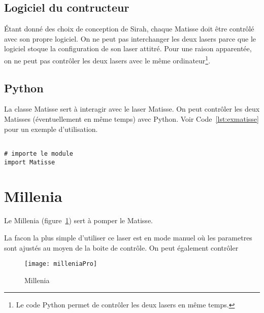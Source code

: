 \documentclass[11pt,francais]{book} %
\begin{document}
\subsection{Logiciel du contructeur}

Étant donné des choix de conception de Sirah, chaque Matisse doit être contrôlé avec son propre logiciel.
On ne peut pas interchanger les deux lasers parce que le logiciel stoque la configuration de son laser attitré.
Pour une raison apparentée, on ne peut pas contrôler les deux lasers avec le même ordinateur\footnote{Le code Python permet de contrôler les deux lasers en même temps.}.

\subsection{Python}

La classe Matisse sert à interagir avec le laser Matisse.
On peut contrôler les deux Matisses (éventuellement en même temps) avec Python.
Voir Code~\ref{lst:exmatisse} pour un exemple d'utilisation.

\begin{lstlisting}[frame=single,caption={Exemple d'utilisation du Matisse avec Python},label={lst:exmatisse},breaklines=true,]  % Start your code-block

# importe le module
import Matisse

\end{lstlisting}


\section{Millenia}

Le Millenia (figure~\ref{fig:millenia}) sert à pomper le Matisse.

La facon la plus simple d'utiliser ce laser est en mode manuel où les parametres sont ajustés au moyen de la boite de contrôle.
On peut également contrôler 

\begin{figure}[h]
\centering\texttt{[image: milleniaPro]}
\caption{Millenia}
\label{fig:millenia}
\end{figure}

\end{document}
